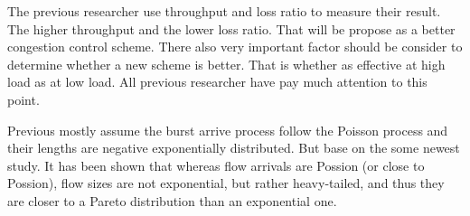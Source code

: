 The previous researcher use throughput and loss ratio to measure their result. The higher throughput and the lower loss ratio. That will be propose as a better congestion control scheme. There also very important factor should be consider to determine whether a new scheme is better. That is whether as effective at high load as at low load. All previous researcher have pay much attention to this point. 

Previous mostly assume the burst arrive process follow the Poisson process and their lengths are negative exponentially distributed. But base on the some newest study. It has been shown that  whereas flow arrivals are Possion (or close to Possion), flow sizes are not exponential, but rather heavy-tailed, and thus they are closer to a Pareto distribution than an exponential one.  

